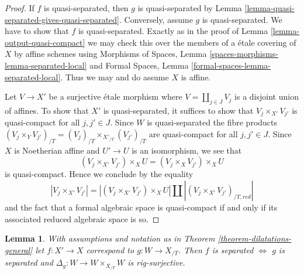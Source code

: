 \documentclass{stacks-project}
\theoremstyle{plain}
\newtheorem{lemma}[subsection]{Lemma}
\theoremstyle{definition}
\theoremstyle{remark}
\numberwithin{equation}{subsection}
\begin{document}
\begin{proof}
If $f$ is quasi-separated, then $g$ is quasi-separated by
Lemma \ref{lemma-quasi-separated-gives-quasi-separated}.
Conversely, assume $g$ is quasi-separated. We have to show
that $f$ is quasi-separated. Exactly as in the proof
of Lemma \ref{lemma-output-quasi-compact} we may check
this over the members of a \'etale covering of $X$ by affine schemes
using Morphisms of Spaces, Lemma
\ref{spaces-morphisms-lemma-separated-local}
and Formal Spaces, Lemma
\ref{formal-spaces-lemma-separated-local}.
Thus we may and do assume $X$ is affine.

\medskip\noindent
Let $V \to X'$ be a surjective \'etale morphism
where $V = \coprod_{j \in J} V_j$ is a disjoint union of affines.
To show that $X'$ is quasi-separated, it suffices to show that
$V_j \times_{X'} V_{j'}$ is quasi-compact for all $j, j' \in J$.
Since $W$ is quasi-separated the fibre products
$(V_j \times_Y V_{j'})_{/T} = (V_j)_{/T} \times_{X'_{/T}} (V_{j'})_{/T}$
are quasi-compact for all $j, j' \in J$. Since $X$ is Noetherian affine
and $U' \to U$ is an isomorphism, we see that
$$
(V_j \times_{X'} V_{j'}) \times_X U =
(V_j \times_X V_{j'}) \times_X U
$$
is quasi-compact. Hence we conclude by the equality
$$
|V_j \times_{X'} V_{j'}| =
|(V_j \times_{X'} V_{j'}) \times_X U| \amalg
|(V_j \times_{X'} V_{j'})_{/T, red}|
$$
and the fact that a formal algebraic space is quasi-compact if and
only if its associated reduced algebraic space is so.
\end{proof}

\begin{lemma}
\label{lemma-output-separated}
With assumptions and notation as in Theorem \ref{theorem-dilatations-general}
let $f : X' \to X$ correspond to $g : W \to X_{/T}$.
Then $f$ is separated $\Leftrightarrow$ $g$ is
separated and $\Delta_g : W \to W \times_{X_{/T}} W$ is rig-surjective.
\end{lemma}
\end{document}
